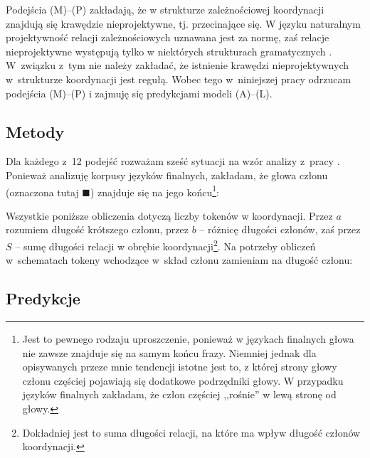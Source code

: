 Podejścia (M)--(P) zakładają, że w strukturze zależnościowej koordynacji znajdują się krawędzie nieprojektywne, tj. przecinające się. W języku naturalnym projektywność relacji zależnościowych uznawana jest za normę, zaś relacje nieprojektywne występują tylko w niektórych strukturach gramatycznych \citep{nivre2006constraints}. W~związku z~tym nie należy zakładać, że istnienie krawędzi nieprojektywnych w~strukturze koordynacji jest regułą. Wobec tego w~niniejszej pracy odrzucam podejścia (M)--(P) i zajmuję się predykcjami modeli (A)--(L).

\subsection{Metody}

Dla każdego z~12 podejść rozważam sześć sytuacji na wzór analizy z~pracy \cite{przepiorkowski2023conjunct}. Ponieważ analizuję korpusy języków finalnych, zakładam, że głowa członu (oznaczona tutaj $\blacksquare$) znajduje się na jego końcu\footnote{
Jest to pewnego rodzaju uproszczenie, ponieważ w językach finalnych głowa nie zawsze znajduje się na samym końcu frazy. Niemniej jednak dla opisywanych przeze mnie tendencji istotne jest to, z której strony głowy członu częściej pojawiają się dodatkowe podrzędniki głowy. W przypadku języków finalnych zakładam, że człon częściej ,,rośnie'' w lewą stronę od głowy.}:



Wszystkie poniższe obliczenia dotyczą liczby tokenów w koordynacji. Przez $a$ rozumiem długość krótszego członu, przez $b$ -- różnicę długości członów, zaś przez $S$ -- sumę długości relacji w obrębie koordynacji\footnote{Dokładniej jest to suma długości relacji, na które ma wpływ długość członów koordynacji.}. Na potrzeby obliczeń w~schematach tokeny wchodzące w~skład członu zamieniam na długość członu:



\subsection{Predykcje}














